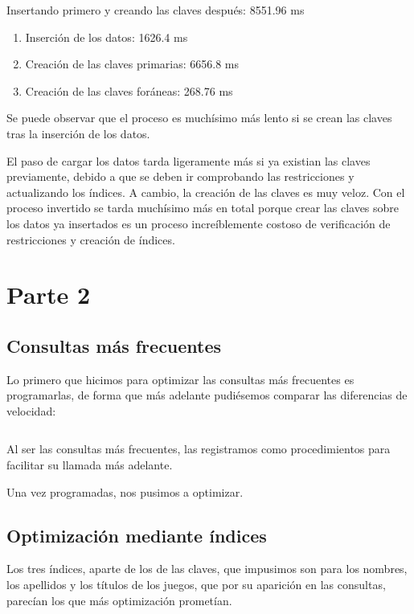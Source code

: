 \documentclass[a4paper, 11pt, oneside]{article} %
\newcommand{\scriptdir}{../scripts/} %
\begin{document}
Insertando primero y creando las claves después: 8551.96 ms

\begin{enumerate}
	\item Inserción de los datos: 1626.4 ms
	\item Creación de las claves primarias: 6656.8 ms
	\item Creación de las claves foráneas: 268.76 ms
\end{enumerate}

Se puede observar que el proceso es muchísimo más lento si se crean las claves tras la inserción de los datos.

El paso de cargar los datos tarda ligeramente más si ya existian las claves previamente, debido a que se deben ir comprobando las restricciones y actualizando los índices. A cambio, la creación de las claves es muy veloz. Con el proceso invertido se tarda muchísimo más en total porque crear las claves sobre los datos ya insertados es un proceso increíblemente costoso de verificación de restricciones y creación de índices.
	
\newpage


\section{Parte 2}

\subsection{Consultas más frecuentes}

Lo primero que hicimos para optimizar las consultas más frecuentes es programarlas, de forma que más adelante pudiésemos comparar las diferencias de velocidad:

\inputminted{mysql}{\scriptdir consultas/procedures.sql}

Al ser las consultas más frecuentes, las registramos como procedimientos para facilitar su llamada más adelante.

Una vez programadas, nos pusimos a optimizar.

\subsection{Optimización mediante índices}

Los tres índices, aparte de los de las claves, que impusimos son para los nombres, los apellidos y los títulos de los juegos, que por su aparición en las consultas, parecían los que más optimización prometían.
\end{document}
